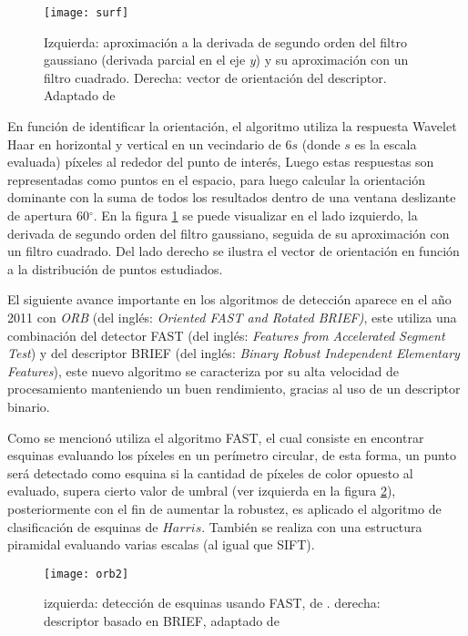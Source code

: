 \begin{figure}[H]
	\centering
	\texttt{[image: surf]}
	\caption[Detector y descriptor SURF]{Izquierda: aproximación a la derivada de segundo orden del filtro gaussiano (derivada parcial en el eje \textit{y}) y su aproximación con un filtro cuadrado. Derecha: vector de orientación del descriptor. Adaptado de \cite{surf}}
	\label{imagen:surf}
\end{figure}

En función de identificar la orientación, el algoritmo utiliza la respuesta Wavelet Haar en horizontal y vertical en un vecindario de 6$s$ (donde $s$ es la escala evaluada) píxeles al rededor del punto de interés, Luego estas respuestas son representadas como puntos en el espacio, para luego calcular la orientación dominante con la suma de todos los resultados dentro de una ventana deslizante de apertura 60$^\circ$. En la figura \ref{imagen:surf} se puede visualizar en el lado izquierdo, la derivada de segundo orden del filtro gaussiano, seguida de su aproximación con un filtro cuadrado. Del lado derecho se ilustra el vector de orientación en función a la distribución de puntos estudiados.

El siguiente avance importante en los algoritmos de detección aparece en el año 2011 con \textit{ORB} \cite{orb} (del inglés: \textit{Oriented FAST and Rotated BRIEF)}, este utiliza una combinación del detector FAST (del inglés: \textit{Features from Accelerated Segment Test}) y del descriptor BRIEF (del inglés: \textit{Binary Robust Independent Elementary Features}), este nuevo algoritmo se caracteriza por su alta velocidad de procesamiento manteniendo un buen rendimiento, gracias al uso de un descriptor binario. 

Como se mencionó utiliza el algoritmo FAST, el cual consiste en encontrar esquinas evaluando los píxeles en un perímetro circular, de esta forma, un punto será detectado como esquina si la cantidad de píxeles de color opuesto al evaluado, supera cierto valor de umbral (ver izquierda en la figura \ref{imagen:orb}), posteriormente con el fin de aumentar la robustez, es aplicado el algoritmo de clasificación de esquinas de $Harris$. También se realiza con una estructura piramidal evaluando varias escalas (al igual que SIFT).

\begin{figure}[H]
	\centering
	\texttt{[image: orb2]}
	\caption[Detector y descriptor ORB]{izquierda: detección de esquinas usando FAST, de \cite{fast}. derecha: descriptor basado en BRIEF, adaptado de\protect\footnotemark }
	\label{imagen:orb}
\end{figure}

